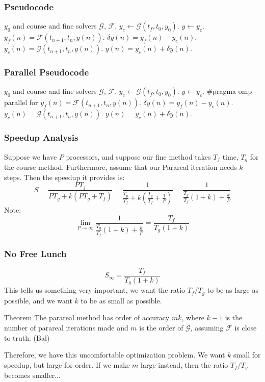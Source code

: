 \documentclass[pdf,12pt]{beamer}
\newcommand{\course}{\mathcal{G}}
\newcommand{\fine}{\mathcal{F}}
\begin{document}
\begin{frame}
  \frametitle{Pseudocode}
  \begin{algorithmic}
    \Require $y_0$ and course and fine solvers $\course$, $\fine$.
    \State $y_c \gets \course(t_f, t_0, y_0)$.
    \State $y \gets y_c$.
        \State $y_f(n) = \fine(t_{n+1},t_n,y(n))$.
        \State $\delta y(n) = y_f(n) - y_c(n)$.
      \EndFor
        \State $y_c(n) = \course(t_{n+1},t_n,y(n))$.
        \State $y(n) = y_c(n) + \delta y(n)$.
      \EndFor
    \EndWhile
  \end{algorithmic}
\end{frame}

\begin{frame}
  \frametitle{Parallel Pseudocode}
  \begin{algorithmic}
    \Require $y_0$ and course and fine solvers $\course$, $\fine$.
    \State $y_c \gets \course(t_f, t_0, y_0)$.
    \State $y \gets y_c$.
      \State \#pragma omp parallel for
        \State $y_f(n) = \fine(t_{n+1},t_n,y(n))$.
        \State $\delta y(n) = y_f(n) - y_c(n)$.
      \EndFor
        \State $y_c(n) = \course(t_{n+1},t_n,y(n))$.
        \State $y(n) = y_c(n) + \delta y(n)$.
      \EndFor
    \EndWhile
  \end{algorithmic}
\end{frame}

\begin{frame}
  \frametitle{Speedup Analysis}
  Suppose we have $P$ processors, and suppose our fine method takes $T_f$ time,
  $T_g$ for the course method. Furthermore, assume that our Parareal iteration
  needs $k$ steps. Then the speedup it provides is:
  \[
    S = \frac{PT_f}{PT_g + k(PT_g + T_f)} 
    = \frac{1}{\frac{T_g}{T_f} + k(\frac{T_g}{T_f} + \frac{1}{P})} 
    = \frac{1}{\frac{T_g}{T_f}(1+k) + \frac{k}{P}} 
  \]
  Note:
  \[
    \lim_{P \to \infty} \frac{1}{\frac{T_g}{T_f}(1+k) + \frac{k}{P}} =
    \frac{T_f}{T_g(1+k)}
  \]
\end{frame}
\begin{frame}
  \frametitle{No Free Lunch}
  \[
    S_\infty = \frac{T_f}{T_g(1+k)}
  \]
  This tells us something very important, we want the ratio $T_f / T_g$ to be as
  large as possible, and we want $k$ to be as small as possible.
  \begin{block}{Theorem}
    The parareal method has order of accuracy $mk$, where $k-1$ is the number of
    parareal iterations made and $m$ is the order of $\course$, assuming $\fine$
    is close to truth. (Bal) 
  \end{block}
  Therefore, we have this uncomfortable optimization problem. We want $k$ small
  for speedup, but large for order. If we make $m$ large instead, then the ratio
  $T_f/T_g$ becomes smaller...
\end{frame}
\end{document}
